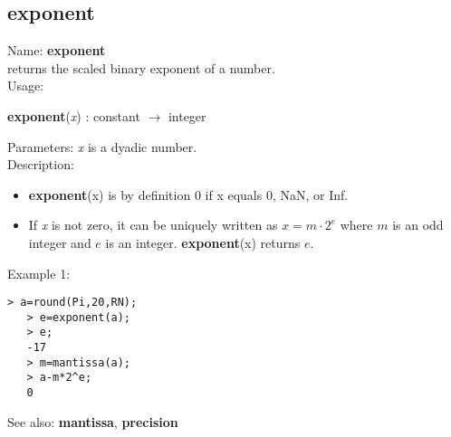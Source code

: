 \subsection{ exponent }
\noindent Name: \textbf{exponent}\\
returns the scaled binary exponent of a number.\\

\noindent Usage: 
\begin{center}
\textbf{exponent}(\emph{x}) : \textsf{constant} $\rightarrow$ \textsf{integer}\\
\end{center}
Parameters: 
\emph{x} is a dyadic number.\\

\noindent Description: \begin{itemize}

\item \textbf{exponent}(x) is by definition 0 if x equals 0, NaN, or Inf.

\item If \emph{x} is not zero, it can be uniquely written as $x = m \cdot 2^e$ where
   $m$ is an odd integer and $e$ is an integer. \textbf{exponent}(x) returns $e$. 
\end{itemize}
\noindent Example 1: 
\begin{center}\begin{minipage}{14.8cm}\begin{Verbatim}[frame=single]
   > a=round(Pi,20,RN);
   > e=exponent(a);
   > e;
   -17
   > m=mantissa(a);
   > a-m*2^e;
   0
\end{Verbatim}
\end{minipage}\end{center}
See also: \textbf{mantissa}, \textbf{precision}
